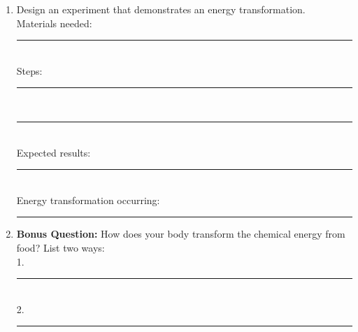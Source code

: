 \documentclass[11pt]{article}
\begin{document}
\begin{conceptbox}
\begin{enumerate}[label=\arabic*., start=9, itemsep=8pt]
\item Design an experiment that demonstrates an energy transformation.\\[6pt]
Materials needed: \rule{0.82\textwidth}{0.5pt}\\[4pt]
Steps: \rule{0.92\textwidth}{0.5pt}\\
\rule{\textwidth}{0.5pt}\\[4pt]
Expected results: \rule{0.84\textwidth}{0.5pt}\\[4pt]
Energy transformation occurring: \rule{0.75\textwidth}{0.5pt}

\item \textbf{Bonus Question:} How does your body transform the chemical energy from food? List two ways:\\
1. \rule{0.9\textwidth}{0.5pt}\\[4pt]
2. \rule{0.9\textwidth}{0.5pt}
\end{enumerate}
\end{conceptbox}
\end{document}
